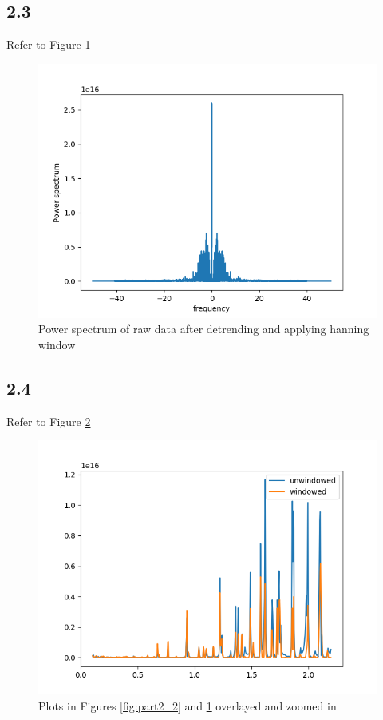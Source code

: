 \subsection*{2.3}
Refer to Figure \ref{fig:part2_3}
\begin{figure}[]
	\caption{Power spectrum of raw data after detrending and applying hanning window}
	\label{fig:part2_3}
	\includegraphics[width=\linewidth]{figures/part2_3.png}
\end{figure}

\subsection*{2.4}
Refer to Figure \ref{fig:part2_4}
\begin{figure}[]
	\caption{Plots in Figures \ref{fig:part2_2} and \ref{fig:part2_3} overlayed and zoomed in}
	\label{fig:part2_4}
	\includegraphics[width=\linewidth]{figures/part2_4.png}
\end{figure}


